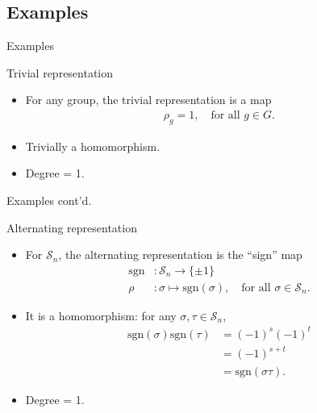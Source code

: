 \documentclass[handout, 10pt]{beamer}
\newcommand{\Sym}{\mathcal{S}}
\newcommand{\sgn}{\text{sgn}}
\begin{document}
	\subsection{Examples}
	\begin{frame}{Examples}
		\begin{exampleblock}{Trivial representation}
			\begin{itemize}
				\item For any group, the trivial representation is a map
				\begin{align*}
					\rho_g = 1, \quad \text{for all $g \in G$.}
				\end{align*}
				
				\item Trivially a homomorphism.
				
				\item Degree = 1.
			\end{itemize}
			
		\end{exampleblock}
	\end{frame}
	\begin{frame}{Examples cont'd.}
		\begin{exampleblock}{Alternating representation}
			\begin{itemize}
				\item For $\Sym_n$, the alternating representation is the ``sign'' map
				\begin{align*}
						\sgn &: \Sym_n \rightarrow \{\pm 1\} \\
					\rho &: \sigma \mapsto \sgn(\sigma), \quad \text{for all } \sigma \in \Sym_n.
				\end{align*}
				
				\item It is a homomorphism: for any $\sigma, \tau \in \Sym_n$,
				\begin{align*}
					\sgn(\sigma)\sgn(\tau) &= (-1)^s(-1)^t \\
					&= (-1)^{s+t} \\
					&= \sgn(\sigma\tau).
				\end{align*}
				
				\item Degree = 1.
			\end{itemize}
		\end{exampleblock}
	\end{frame}
	
\end{document}
